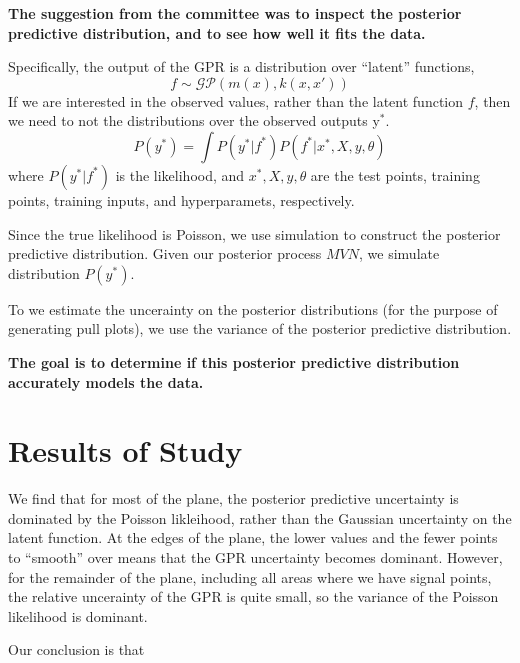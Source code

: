 \documentclass[12pt]{article}
\begin{document}
\textbf{The suggestion from the committee was to inspect the posterior predictive distribution, and to see how well it fits the data.
}

Specifically, the output of the GPR is a distribution over ``latent'' functions,
\begin{equation}
  f \sim \mathcal{GP} \left( m(x), k(x,x') \right) 
\end{equation}
If we are interested in the observed values, rather than the latent function $f$, then we need to not the distributions over the observed outputs y$^{*}$.
\begin{equation}
  P(y^{*}) = \int P(y^{*} | f^{*}) P(f^{*}| x^{*},X,y,\theta)
\end{equation}
where $P(y^{*} | f^{*}) $ is the likelihood, and $x^{*},X,y,\theta$ are the test points, training points, training inputs, and hyperparamets, respectively. 

Since the true likelihood is Poisson, we use simulation to construct the posterior predictive distribution.
Given our posterior process $MVN$, we simulate distribution $P(y^{*})$.

To we estimate the uncerainty on the posterior distributions (for the purpose of generating pull plots), we use the variance of the posterior predictive distribution. 

{\bfseries The goal is to determine if this posterior predictive distribution accurately models the data.}

\section{Results of Study}

We find that for most of the plane, the posterior predictive uncertainty is dominated by the Poisson likleihood, rather than the Gaussian uncertainty on the latent function.
At the edges of the plane, the lower values and the fewer points to ``smooth'' over means that the GPR uncertainty becomes dominant.
However, for the remainder of the plane, including all areas where we have signal points, the relative uncerainty of the GPR is quite small, so the variance of the Poisson likelihood is dominant.


Our conclusion is that 
\end{document}
